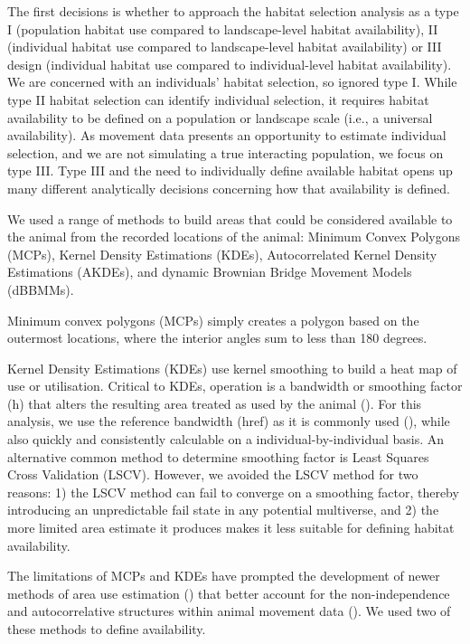 \documentclass[10pt,a4paper]{article}
\begin{document}
The first decisions is whether to approach the habitat selection analysis as a type I (population habitat use compared to landscape-level habitat availability), II (individual habitat use compared to landscape-level habitat availability) or III design (individual habitat use compared to individual-level habitat availability).
We are concerned with an individuals' habitat selection, so ignored type I.
While type II habitat selection can identify individual selection, it requires habitat availability to be defined on a population or landscape scale (i.e., a universal availability).
As movement data presents an opportunity to estimate individual selection, and we are not simulating a true interacting population, we focus on type III.
Type III and the need to individually define available habitat opens up many different analytically decisions concerning how that availability is defined.

We used a range of methods to build areas that could be considered available to the animal from the recorded locations of the animal: Minimum Convex Polygons (MCPs), Kernel Density Estimations (KDEs), Autocorrelated Kernel Density Estimations (AKDEs), and dynamic Brownian Bridge Movement Models (dBBMMs).

Minimum convex polygons (MCPs) simply creates a polygon based on the outermost locations, where the interior angles sum to less than 180 degrees.

Kernel Density Estimations (KDEs) use kernel smoothing to build a heat map of use or utilisation.
Critical to KDEs, operation is a bandwidth or smoothing factor (h) that alters the resulting area treated as used by the animal ().
For this analysis, we use the reference bandwidth (href) as it is commonly used (), while also quickly and consistently calculable on a individual-by-individual basis.
An alternative common method to determine smoothing factor is Least Squares Cross Validation (LSCV).
However, we avoided the LSCV method for two reasons: 1) the LSCV method can fail to converge on a smoothing factor, thereby introducing an unpredictable fail state in any potential multiverse, and 2) the more limited area estimate it produces makes it less suitable for defining habitat availability.

The limitations of MCPs and KDEs have prompted the development of newer methods of area use estimation () that better account for the non-independence and autocorrelative structures within animal movement data ().
We used two of these methods to define availability.
\end{document}

